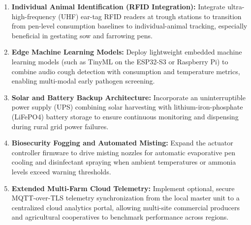 \begin{enumerate}[label=\arabic*.]
    \item \textbf{Individual Animal Identification (RFID Integration):} Integrate ultra-high-frequency (UHF) ear-tag RFID readers at trough stations to transition from pen-level consumption baselines to individual-animal tracking, especially beneficial in gestating sow and farrowing pens.
    
    \item \textbf{Edge Machine Learning Models:} Deploy lightweight embedded machine learning models (such as TinyML on the ESP32-S3 or Raspberry Pi) to combine audio cough detection with consumption and temperature metrics, enabling multi-modal early pathogen screening.
    
    \item \textbf{Solar and Battery Backup Architecture:} Incorporate an uninterruptible power supply (UPS) combining solar harvesting with lithium-iron-phosphate (LiFePO4) battery storage to ensure continuous monitoring and dispensing during rural grid power failures.
    
    \item \textbf{Biosecurity Fogging and Automated Misting:} Expand the actuator controller firmware to drive misting nozzles for automatic evaporative pen cooling and disinfectant spraying when ambient temperatures or ammonia levels exceed warning thresholds.
    
    \item \textbf{Extended Multi-Farm Cloud Telemetry:} Implement optional, secure MQTT-over-TLS telemetry synchronization from the local master unit to a centralized cloud analytics portal, allowing multi-site commercial producers and agricultural cooperatives to benchmark performance across regions.
\end{enumerate}
